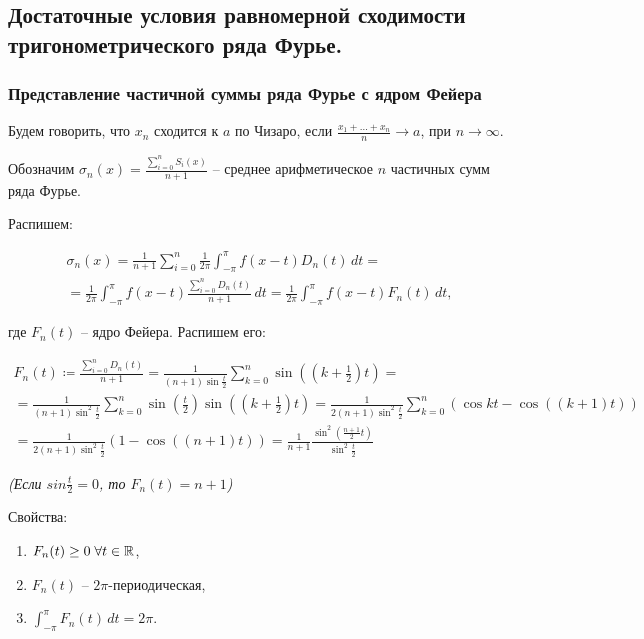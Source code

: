 \subsection{Достаточные условия равномерной сходимости тригонометрического ряда Фурье.}

\subsubsection{Представление частичной суммы ряда Фурье с ядром Фейера}

\Def Будем говорить, что $x_n$ сходится к $a$ по Чизаро, если $\frac{x_1 + \dots + x_n}{n} \to a$, при $n \to \infty$.

Обозначим $\sigma_n(x) = \frac{\sum_{i=0}^n S_i(x)}{n+1}$ -- среднее арифметическое $n$ частичных сумм ряда Фурье.

Распишем:

\begin{gather*}
    \sigma_n(x)  = \frac{1}{n+1} \sum_{i=0}^n \frac{1}{2\pi} \int_{-\pi}^\pi f(x-t) D_n(t) \,dt = \\
    = \frac{1}{2\pi} \int_{-\pi}^\pi f(x-t) \frac{\sum_{i=0}^n D_n(t)}{n+1} \,dt = \frac{1}{2\pi} \int_{-\pi}^\pi f(x-t) F_n(t) \,dt,
\end{gather*}

где $F_n(t)$ -- ядро Фейера. Распишем его:

\begin{gather*}
    F_n(t) \coloneqq \frac{\sum_{i=0}^n D_n(t)}{n+1} = \frac{1}{(n+1)\sin \frac{t}{2}} \sum_{k=0}^n \sin \left(\left(k + \frac{1}{2}\right)t\right) = \\
    = \frac{1}{(n+1)\sin^2 \frac{t}{2}} \sum_{k=0}^n \sin\left(\frac{t}{2}\right) \sin \left(\left(k + \frac{1}{2}\right)t\right) =
    \frac{1}{2 (n+1)\sin^2 \frac{t}{2}} \sum_{k=0}^n \left(\cos kt - \cos ((k+1) t)\right) \\
    = \frac{1}{2 (n+1)\sin^2 \frac{t}{2}} \left(1 - \cos ((n+1)t)\right) = \frac{1}{n+1} \frac{\sin^2 \left(\frac{n+1}{2} t\right)}{\sin^2 \frac{t}{2}}
\end{gather*}

\textit{(Если $sin \frac{t}{2} = 0$, то $F_n(t) = n+1$)}

Свойства:

\begin{enumerate}
    \item $F_n(t) \geq 0 \; \forall t \in \mathbb{R}$,
    \item $F_n(t)$ -- $2\pi$-периодическая,
    \item $\int_{-\pi}^\pi F_n(t) \,dt = 2\pi$.
\end{enumerate}


